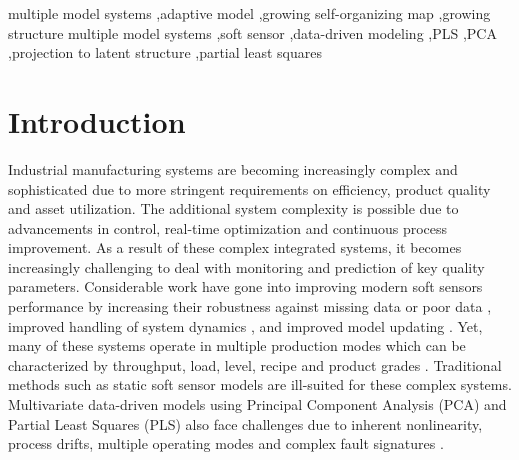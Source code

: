 \documentclass[review,3p]{elsarticle}
\renewcommand\[{\begin{equation}}
\renewcommand\]{\end{equation}}
\begin{document}
\begin{frontmatter}
\begin{keyword}
multiple model systems \sep  adaptive model \sep  growing self-organizing map \sep  growing structure multiple model systems \sep  soft sensor \sep  data-driven modeling \sep  PLS \sep  PCA \sep  projection to latent structure \sep  partial least squares
\end{keyword}
\end{frontmatter}
%
%
\label{sec:gsmms}
\section{Introduction}
Industrial manufacturing systems are becoming increasingly complex and
sophisticated due to more stringent requirements on efficiency, product quality and asset utilization. The additional system complexity is possible due to advancements in control, real-time optimization and continuous process
improvement. As a result of these complex integrated systems, it becomes increasingly challenging to deal with monitoring and prediction of key quality parameters. Considerable work have gone into improving modern soft sensors performance by increasing their robustness against missing data or poor data \cite{Guo2014,Zhu2015,Godoy2017}, improved handling of system dynamics \cite{Shang2015}, and improved model updating \cite{Chen2017,Cao2014}. Yet, many of these systems operate in multiple production modes which can be characterized by throughput, load, level, recipe and product grades \cite{Qin2012}.
Traditional methods such as static soft sensor models are ill-suited for
these complex systems. Multivariate data-driven models using Principal Component Analysis (PCA) and Partial Least Squares (PLS) also face challenges due to inherent nonlinearity, process drifts, multiple operating modes and complex fault signatures
\cite{Kadlec2011}. 
\end{document}
